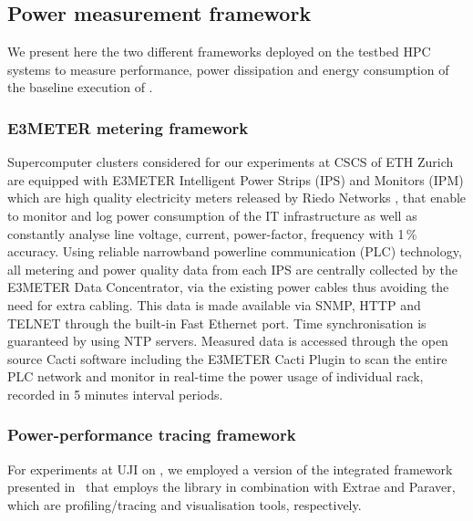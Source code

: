 \subsection{Power measurement framework}
\label{subsec:3.3}

We present here the two different  frameworks deployed on the testbed HPC systems to
measure  performance, power  dissipation and energy consumption of the baseline execution of \cosmoart.

\subsubsection{E3METER metering framework}

Supercomputer  clusters considered  for our  experiments at CSCS of ETH Zurich are equipped with
E3METER Intelligent  Power Strips (IPS)  and Monitors (IPM)  which are
high   quality   electricity  meters   released   by  Riedo   Networks
\citep{Riedonetworks},   that  enable   to  monitor   and   log  power
consumption  of the IT  infrastructure as  well as  constantly analyse
line  voltage,  current, power-factor,  frequency  with 1\,\%  accuracy.
Using  reliable narrowband  powerline communication  (PLC) technology,
all  metering and  power  quality  data from  each  IPS are  centrally
collected  by the E3METER  Data Concentrator,  via the  existing power
cables thus  avoiding the need for  extra cabling.  This  data is made
available via  SNMP, HTTP and TELNET  through the built-in  Fast Ethernet
port.   Time  synchronisation  is  guaranteed by  using  NTP  servers.
Measured  data is  accessed  through the  open  source Cacti  software
including the E3METER Cacti Plugin  to scan the entire PLC network and
monitor in real-time the power usage of individual rack, recorded in 5
minutes interval periods.

\subsubsection{Power-performance tracing framework}

For experiments at UJI on \tinto, we employed a version
of the integrated framework presented in~\cite{energy13} that employs the \pmlib library in
combination with Extrae and Paraver, which  are profiling/tracing and
visualisation tools, respectively. 

